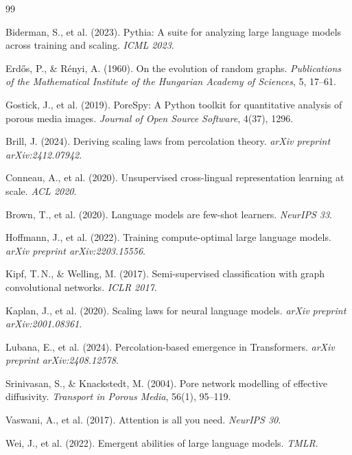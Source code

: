\documentclass[11pt,a4paper]{article}
\begin{document}

\begin{thebibliography}{99}

Biderman, S., et al. (2023).
\newblock Pythia: A suite for analyzing large language models across training and scaling.
\newblock \emph{ICML 2023}.

Erd\H{o}s, P., \& R\'{e}nyi, A. (1960).
\newblock On the evolution of random graphs.
\newblock \emph{Publications of the Mathematical Institute of the Hungarian Academy of Sciences}, 5, 17--61.

Gostick, J., et al. (2019).
\newblock PoreSpy: A Python toolkit for quantitative analysis of porous media images.
\newblock \emph{Journal of Open Source Software}, 4(37), 1296.

Brill, J. (2024).
\newblock Deriving scaling laws from percolation theory.
\newblock \emph{arXiv preprint arXiv:2412.07942}.

Conneau, A., et al. (2020).
\newblock Unsupervised cross-lingual representation learning at scale.
\newblock \emph{ACL 2020}.

Brown, T., et al. (2020).
\newblock Language models are few-shot learners.
\newblock \emph{NeurIPS 33}.

Hoffmann, J., et al. (2022).
\newblock Training compute-optimal large language models.
\newblock \emph{arXiv preprint arXiv:2203.15556}.

Kipf, T.\,N., \& Welling, M. (2017).
\newblock Semi-supervised classification with graph convolutional networks.
\newblock \emph{ICLR 2017}.

Kaplan, J., et al. (2020).
\newblock Scaling laws for neural language models.
\newblock \emph{arXiv preprint arXiv:2001.08361}.

Lubana, E., et al. (2024).
\newblock Percolation-based emergence in Transformers.
\newblock \emph{arXiv preprint arXiv:2408.12578}.

Srinivasan, S., \& Knackstedt, M. (2004).
\newblock Pore network modelling of effective diffusivity.
\newblock \emph{Transport in Porous Media}, 56(1), 95--119.

Vaswani, A., et al. (2017).
\newblock Attention is all you need.
\newblock \emph{NeurIPS 30}.

Wei, J., et al. (2022).
\newblock Emergent abilities of large language models.
\newblock \emph{TMLR}.

\end{thebibliography}
\end{document}
